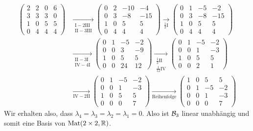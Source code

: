 \documentclass[a4paper,10pt]{article}
\begin{document}
\begin{align*}
 \begin{pmatrix}
  2 & 2 & 0 & 6 \\
  3 & 3 & 3 & 0 \\
  1 & 0 & 5 & 5 \\
  0 & 4 & 4 & 4
 \end{pmatrix}
 &\xrightarrow[\substack{\text{I}-2\text{III} \\ \text{II}-3\text{III}}]{}
 \begin{pmatrix}
  0 & 2 & -10 &  -4 \\
  0 & 3 &  -8 & -15 \\
  1 & 0 &   5 &   5 \\
  0 & 4 &   4 &   4
 \end{pmatrix}
 \xrightarrow[\frac{1}{2}\text{I}]{}
 \begin{pmatrix}
  0 & 1 & -5 &  -2 \\
  0 & 3 & -8 & -15 \\
  1 & 0 &  5 &   5 \\
  0 & 4 &  4 &   4
 \end{pmatrix}
 \\
 &\xrightarrow[\substack{\text{II}-3\text{I} \\ \text{IV}-4\text{I}}]{}
 \begin{pmatrix}
  0 & 1 & -5 & -2 \\
  0 & 0 &  3 & -9 \\
  1 & 0 &  5 &  5 \\
  0 & 0 & 24 & 12
 \end{pmatrix}
 \xrightarrow[\substack{\frac{1}{3}\text{II} \\ \frac{1}{12}\text{IV}}]{}
 \begin{pmatrix}
  0 & 1 & -5 & -2 \\
  0 & 0 &  1 & -3 \\
  1 & 0 &  5 &  5 \\
  0 & 0 &  2 &  1
 \end{pmatrix}
 \\
 &\xrightarrow[\text{IV}-2\text{II}]{}
 \begin{pmatrix}
  0 & 1 & -5 & -2 \\
  0 & 0 &  1 & -3 \\
  1 & 0 &  5 &  5 \\
  0 & 0 &  0 &  7
 \end{pmatrix}
 \xrightarrow[\text{Reihenfolge}]{}
 \begin{pmatrix}
  1 & 0 &  5 &  5 \\
  0 & 1 & -5 & -2 \\
  0 & 0 &  1 & -3 \\
  0 & 0 &  0 &  7
 \end{pmatrix}
\end{align*}
Wir erhalten also, dass $\lambda_4 = \lambda_3 = \lambda_2 = \lambda_1 = 0$. Also ist $\mathcal{B}_3$ linear unabhängig und somit eine Basis von $\mathrm{Mat}(2 \times 2, \mathbb{R})$.
\end{document}
